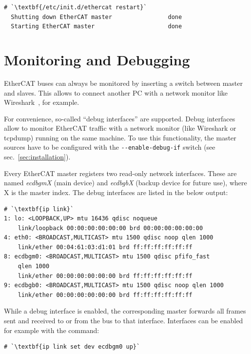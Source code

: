 \documentclass[a4paper,12pt,BCOR6mm,bibtotoc,idxtotoc]{scrbook}
\begin{document}
\begin{lstlisting}[gobble=2]
  # `\textbf{/etc/init.d/ethercat restart}`
  Shutting down EtherCAT master                done
  Starting EtherCAT master                     done
\end{lstlisting}


\section{Monitoring and Debugging}
\label{sec:debug}

EtherCAT buses can always be monitored by inserting a switch between master
and slaves. This allows to connect another PC with a network monitor like
Wireshark~\cite{wireshark}, for example.

For convenience, so-called ``debug interfaces'' are supported. Debug interfaces
allow to monitor EtherCAT traffic with a network monitor (like Wireshark or
tcpdump) running on the same machine. To use this functionality, the master
sources have to be configured with the \lstinline+--enable-debug-if+ switch
(see sec.~\ref{sec:installation}).

Every EtherCAT master registers two read-only network interfaces. These are
named \textit{ecdbgmX} (main device) and \textit{ecdbgbX} (backup device for
future use), where X is the master index. The debug interfaces are listed in
the below output:

\begin{lstlisting}
# `\textbf{ip link}`
1: lo: <LOOPBACK,UP> mtu 16436 qdisc noqueue
    link/loopback 00:00:00:00:00:00 brd 00:00:00:00:00:00
4: eth0: <BROADCAST,MULTICAST> mtu 1500 qdisc noop qlen 1000
    link/ether 00:04:61:03:d1:01 brd ff:ff:ff:ff:ff:ff
8: ecdbgm0: <BROADCAST,MULTICAST> mtu 1500 qdisc pfifo_fast
    qlen 1000
    link/ether 00:00:00:00:00:00 brd ff:ff:ff:ff:ff:ff
9: ecdbgb0: <BROADCAST,MULTICAST> mtu 1500 qdisc noop qlen 1000
    link/ether 00:00:00:00:00:00 brd ff:ff:ff:ff:ff:ff
\end{lstlisting}

While a debug interface is enabled, the corresponding master forwards all
frames sent and received to or from the bus to that interface. Interfaces can
be enabled for example with the command:

\begin{lstlisting}
# `\textbf{ip link set dev ecdbgm0 up}`
\end{lstlisting}
\end{document}
